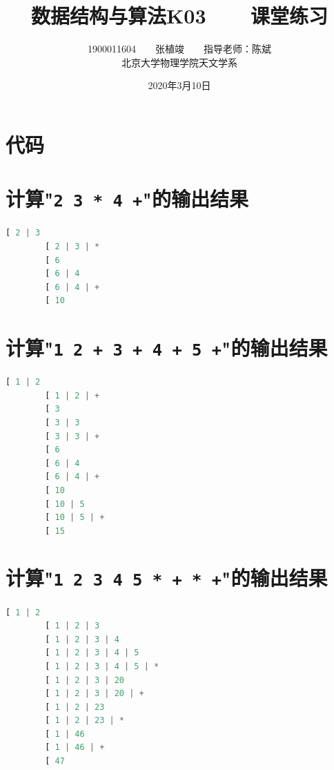 \documentclass[a4 paper,fontset=windows]{ctexart}
\begin{document}
	\title{\textbf{数据结构与算法K03\ \ \ \ 课堂练习}}
	\author{1900011604\ \ \ \ 张植竣\ \ \ \ 指导老师：陈斌\\北京大学物理学院天文学系}
	\date{2020年3月10日}
		\maketitle

		\section{代码}
		

		\section{计算"\texttt{2\ 3\ *\ 4\ +}"的输出结果}
		\begin{lstlisting}[language=python]
		[ 2 | 3
		[ 2 | 3 | *
		[ 6
		[ 6 | 4
		[ 6 | 4 | +
		[ 10
		\end{lstlisting}

		\section{计算"\texttt{1\ 2\ +\ 3\ +\ 4\ +\ 5\ +}"的输出结果}
		\begin{lstlisting}[language=python]
		[ 1 | 2
		[ 1 | 2 | +
		[ 3
		[ 3 | 3
		[ 3 | 3 | +
		[ 6
		[ 6 | 4
		[ 6 | 4 | +
		[ 10
		[ 10 | 5
		[ 10 | 5 | +
		[ 15
		\end{lstlisting}

		\section{计算"\texttt{1\ 2\ 3\ 4\ 5\ *\ +\ *\ +}"的输出结果}
		\begin{lstlisting}[language=python]
		[ 1 | 2
		[ 1 | 2 | 3
		[ 1 | 2 | 3 | 4
		[ 1 | 2 | 3 | 4 | 5
		[ 1 | 2 | 3 | 4 | 5 | *
		[ 1 | 2 | 3 | 20
		[ 1 | 2 | 3 | 20 | +
		[ 1 | 2 | 23
		[ 1 | 2 | 23 | *
		[ 1 | 46
		[ 1 | 46 | +
		[ 47
		\end{lstlisting}
\end{document}
